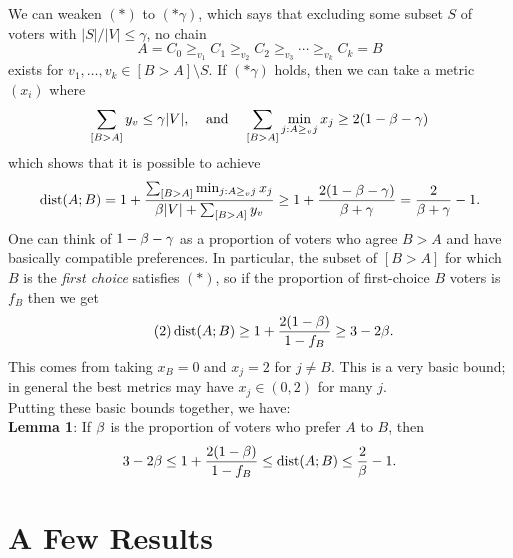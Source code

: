 \documentclass{amsart}
\DeclareMathOperator{\dist}{\rm{dist}}
\begin{document}
We can weaken $(\ast)$ to $(\ast \gamma)$, which says that excluding some subset $S$ of voters with $|S|/|V| \leq \gamma$, no chain 
$$
A = C_0\geq_{v_1} C_1 \geq_{v_2} C_2 \geq_{v_3} \cdots \geq_{v_{k}} C_{k} = B
$$
exists for $v_1,\dots,v_k\in [B>A]\setminus S$. If $(\ast \gamma)$ holds, then we can take a metric $(x_i)$ where 
$$
\sum_{[B>A]} y_v \leq \gamma|V|, \;\;\;\; \text{and} \;\;\;\; \sum_{[B>A]} \min_{j:A\geq_v j} x_j \geq 2(1-\beta -\gamma)
$$
which shows that it is possible to achieve
$$
\dist(A;B) = 1 + \frac{\sum_{[B>A]} \min_{j:A\geq_v j} x_j}{ \b |V| + \sum_{[B>A]} y_v} \geq 1 + \frac{2(1-\b - \gamma)}{\b + \gamma} = \frac{2}{\b + \gamma} - 1.
$$
One can think of $1-\beta - \gamma$ as a proportion of voters who agree $B>A$ and have basically compatible preferences. In particular, the subset of $[B>A]$ for which $B$ is the \textit{first choice} satisfies $(\ast)$, so if the proportion of first-choice $B$ voters is $f_B$ then we get
\begin{equation}
	\tag{$2$}
\dist(A;B) \geq 1 + \frac{2(1-\b)}{1-f_B} \geq 3-2\b.
\end{equation}
This comes from taking $x_B=0$ and $x_j=2$ for $j\neq B$. This is a very basic bound; in general the best metrics may have $x_j \in (0,2)$ for many $j$.\\


Putting these basic bounds together, we have:\\

\noindent \textbf{Lemma 1}: If $\beta$ is the proportion of voters who prefer $A$ to $B$, then
$$
3-2\b \leq 1 + \frac{2(1-\b)}{1-f_B} \leq \dist(A;B) \leq \frac{2}{\b} - 1.
$$

\newpage 

\section{A Few Results}
\end{document}
